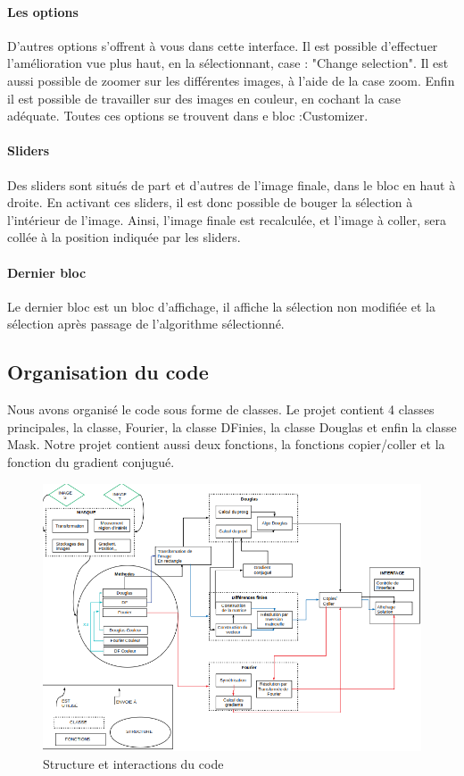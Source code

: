 \paragraph{Les options}
D'autres options s'offrent à vous dans cette interface. Il est possible d'effectuer l'amélioration vue plus haut, en la sélectionnant, case : "Change selection". Il est aussi possible de zoomer sur les différentes images, à l'aide de la case zoom. Enfin il est possible de travailler sur des images en couleur, en cochant la case adéquate. Toutes ces options se trouvent dans e bloc :Customizer.
\paragraph{Sliders}
Des sliders sont situés de part et d'autres de l'image finale, dans le bloc en haut à droite. En activant ces sliders, il est donc possible de bouger la sélection à l'intérieur de l'image. Ainsi, l'image finale est recalculée, et l'image à coller, sera collée à la position indiquée par les sliders.
\paragraph{Dernier bloc}
Le dernier bloc est un bloc d'affichage, il affiche la sélection non modifiée et la sélection après passage de l'algorithme  sélectionné.
\subsection{Organisation du code}
Nous avons organisé le code sous forme de classes. Le projet contient 4 classes principales, la classe, Fourier, la classe DFinies, la classe Douglas et enfin la classe  Mask. Notre projet contient aussi deux fonctions, la fonctions copier/coller et la fonction du gradient conjugué.


\begin{figure}
\includegraphics[scale=0.65]{Images/code/schema.png}
\caption{Structure et interactions du code}
\end{figure}
\newpage

